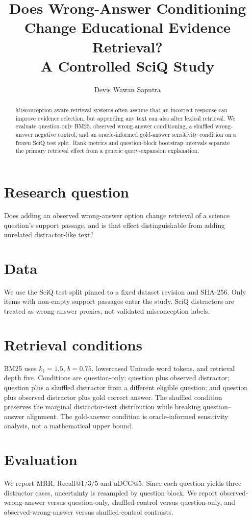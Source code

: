 \documentclass[11pt]{article}
\title{Does Wrong-Answer Conditioning Change Educational Evidence Retrieval?\\A Controlled SciQ Study}
\author{Devis Wawan Saputra}
\date{}
\begin{document}
\maketitle

\begin{abstract}
Misconception-aware retrieval systems often assume that an incorrect response can improve evidence selection, but appending any text can also alter lexical retrieval. We evaluate question-only BM25, observed wrong-answer conditioning, a shuffled wrong-answer negative control, and an oracle-informed gold-answer sensitivity condition on a frozen SciQ test split. Rank metrics and question-block bootstrap intervals separate the primary retrieval effect from a generic query-expansion explanation.
\end{abstract}

\section{Research question}
Does adding an observed wrong-answer option change retrieval of a science question's support passage, and is that effect distinguishable from adding unrelated distractor-like text?

\section{Data}
We use the SciQ test split \cite{welbl2017sciq} pinned to a fixed dataset revision and SHA-256. Only items with non-empty support passages enter the study. SciQ distractors are treated as wrong-answer proxies, not validated misconception labels.

\section{Retrieval conditions}
BM25 \cite{robertson2009bm25} uses $k_1=1.5$, $b=0.75$, lowercased Unicode word tokens, and retrieval depth five. Conditions are question-only; question plus observed distractor; question plus a shuffled distractor from a different eligible question; and question plus observed distractor plus gold correct answer. The shuffled condition preserves the marginal distractor-text distribution while breaking question--answer alignment. The gold-answer condition is oracle-informed sensitivity analysis, not a mathematical upper bound.

\section{Evaluation}
We report MRR, Recall@1/3/5 and nDCG@5. Since each question yields three distractor cases, uncertainty is resampled by question block. We report observed-wrong-answer versus question-only, shuffled-control versus question-only, and observed-wrong-answer versus shuffled-control contrasts.
\end{document}
